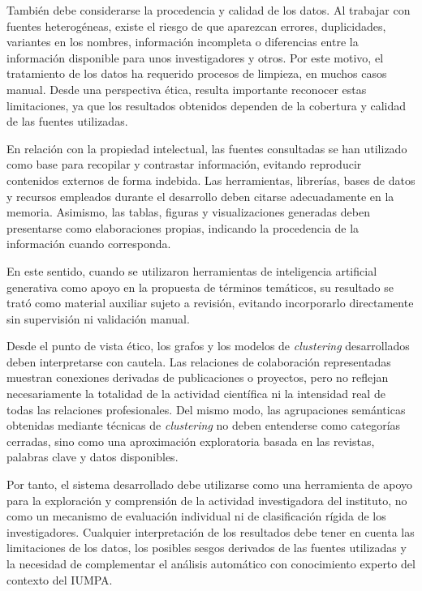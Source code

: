 \documentclass[11pt,spanish,listoffigures,listoftables]{tfgetsinf}
\begin{document}
También debe considerarse la procedencia y calidad de los datos. Al trabajar con fuentes heterogéneas, existe el riesgo de que aparezcan errores, duplicidades, variantes en los nombres, información incompleta o diferencias entre la información disponible para unos investigadores y otros. Por este motivo, el tratamiento de los datos ha requerido procesos de limpieza, en muchos casos manual. Desde una perspectiva ética, resulta importante reconocer estas limitaciones, ya que los resultados obtenidos dependen de la cobertura y calidad de las fuentes utilizadas.

En relación con la propiedad intelectual, las fuentes consultadas se han utilizado como base para recopilar y contrastar información, evitando reproducir contenidos externos de forma indebida. Las herramientas, librerías, bases de datos y recursos empleados durante el desarrollo deben citarse adecuadamente en la memoria. Asimismo, las tablas, figuras y visualizaciones generadas deben presentarse como elaboraciones propias, indicando la procedencia de la información cuando corresponda.

En este sentido, cuando se utilizaron herramientas de inteligencia artificial generativa como apoyo en la propuesta de términos temáticos, su resultado se trató como material auxiliar sujeto a revisión, evitando incorporarlo directamente sin supervisión ni validación manual.

Desde el punto de vista ético, los grafos y los modelos de \textit{clustering} desarrollados deben interpretarse con cautela. Las relaciones de colaboración representadas muestran conexiones derivadas de publicaciones o proyectos, pero no reflejan necesariamente la totalidad de la actividad científica ni la intensidad real de todas las relaciones profesionales. Del mismo modo, las agrupaciones semánticas obtenidas mediante técnicas de \textit{clustering} no deben entenderse como categorías cerradas, sino como una aproximación exploratoria basada en las revistas, palabras clave y datos disponibles.

Por tanto, el sistema desarrollado debe utilizarse como una herramienta de apoyo para la exploración y comprensión de la actividad investigadora del instituto, no como un mecanismo de evaluación individual ni de clasificación rígida de los investigadores. Cualquier interpretación de los resultados debe tener en cuenta las limitaciones de los datos, los posibles sesgos derivados de las fuentes utilizadas y la necesidad de complementar el análisis automático con conocimiento experto del contexto del IUMPA.
\end{document}
